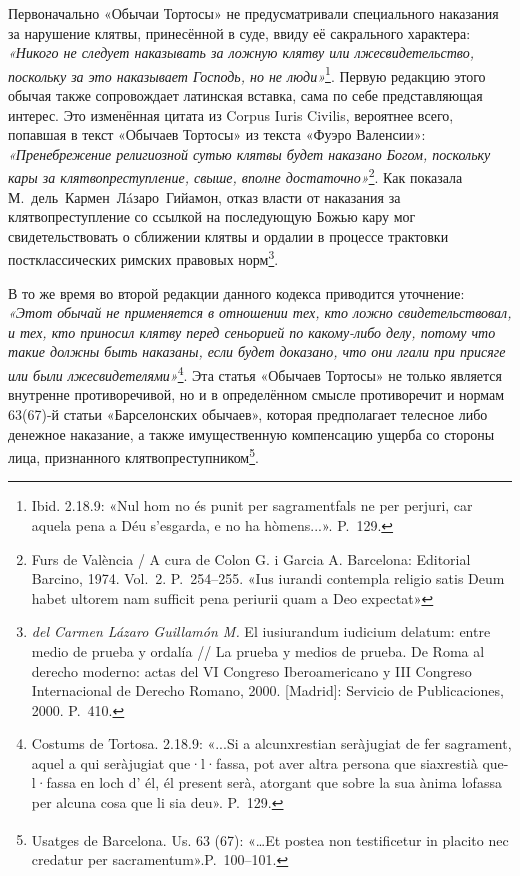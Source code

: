 Первоначально «Обычаи Тортосы» не предусматривали специального наказания за нарушение клятвы, принесённой в суде, ввиду её сакрального характера: \emph{«Никого не следует наказывать за ложную клятву или лжесвидетельство, поскольку за это наказывает Господь, но не люди»}\footnote{Ibid. 2.18.9: «Nul hom no és punit per sagramentfals ne per perjuri, car aquela pena a Déu s'esgarda, e no ha hòmens...». P.~129.}. Первую редакцию этого обычая также сопровождает латинская вставка, сама по себе представляющая интерес. Это изменённая цитата из Corpus Iuris Civilis, вероятнее всего, попавшая в текст «Обычаев Тортосы» из текста «Фуэро Валенсии»: \emph{«Пренебрежение религиозной сутью клятвы будет наказано Богом, поскольку кары за клятвопреступление, свыше, вполне достаточно»}\footnote{Furs de València / A cura de Colon G. i Garcia A. Barcelona: Editorial Barcino, 1974. Vol.~2. P.~254--255. «Ius iurandi contempla religio satis Deum habet ultorem nam sufficit pena periurii quam a Deo expectat»}. Как показала М.~дель~Кармен~Лáзаро~Гийамон, отказ власти от наказания за клятвопреступление со ссылкой на последующую Божью кару мог свидетельствовать о сближении клятвы и ордалии в процессе трактовки постклассических римских правовых норм\footnote{\emph{del Carmen Lázaro Guillamón M. }El iusiurandum iudicium delatum: entre medio de prueba y ordalía // La prueba y medios de prueba. De Roma al derecho moderno: actas del VI Congreso Iberoamericano y III Congreso Internacional de Derecho Romano, 2000. [Madrid]: Servicio de Publicaciones, 2000. P.~410.}.

В то же время во второй редакции данного кодекса приводится уточнение: \emph{«Этот обычай не применяется в отношении тех, кто ложно свидетельствовал, и тех, кто приносил клятву перед сеньорией по какому-либо делу, потому что такие должны быть наказаны, если будет доказано, что они лгали при присяге или были лжесвидетелями»}\footnote{Costums de Tortosa. 2.18.9: «...Si a alcunxrestian seràjugiat de fer sagrament, aquel a qui seràjugiat que·l·fassa, pot aver altra persona que siaxrestià que-l·fassa en loch d' él, él present serà, atorgant que sobre la sua ànima lofassa per alcuna cosa que li sia deu». P.~129.}. Эта статья «Обычаев Тортосы» не только является внутренне противоречивой, но и в определённом смысле противоречит и нормам 63(67)-й статьи «Барселонских обычаев», которая предполагает телесное либо денежное наказание, а также имущественную компенсацию ущерба со стороны лица, признанного клятвопреступником\footnote{\textsuperscript{ }Usatges de Barcelona. Us. 63 (67): «…Et postea non testificetur in placito nec credatur per sacramentum».P.~100--101.}.

